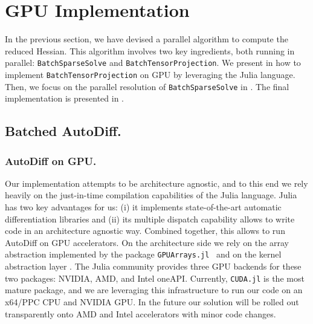 \section{GPU Implementation}
\label{sec:implementation}

In the previous section, we have devised a parallel algorithm to compute
the reduced Hessian. This algorithm involves two key ingredients, both
running in parallel: {\tt BatchSparseSolve} and {\tt BatchTensorProjection}.
We present in  how to implement
{\tt BatchTensorProjection} on GPU by leveraging the Julia language. Then,
we focus on the parallel
resolution of {\tt BatchSparseSolve} in .
The final implementation is presented in .

\subsection{Batched AutoDiff.}
\label{sec:implementation:autodiff}

\subsubsection{AutoDiff on GPU.}
\label{sec:implementation:design}

Our implementation attempts to be architecture agnostic, and to this
end we rely heavily on the just-in-time compilation capabilities of the Julia language.
Julia has two key advantages for us: (i) it implements state-of-the-art automatic differentiation
libraries and (ii) its multiple dispatch capability allows to write code in
an architecture agnostic way.
Combined together, this allows to run AutoDiff on GPU accelerators.
On the architecture side we rely on the array
abstraction implemented by the package \lstinline{GPUArrays.jl}~\cite{besard2018effective} and on the
kernel abstraction layer \KA.
The Julia community provides three GPU backends for these two packages:
NVIDIA, AMD, and Intel oneAPI. Currently, \lstinline{CUDA.jl} is the most
mature package, and we are leveraging this infrastructure to run our code on an
x64/PPC CPU and NVIDIA GPU. In the future our solution will be rolled out
transparently onto AMD and Intel accelerators with minor code changes.

